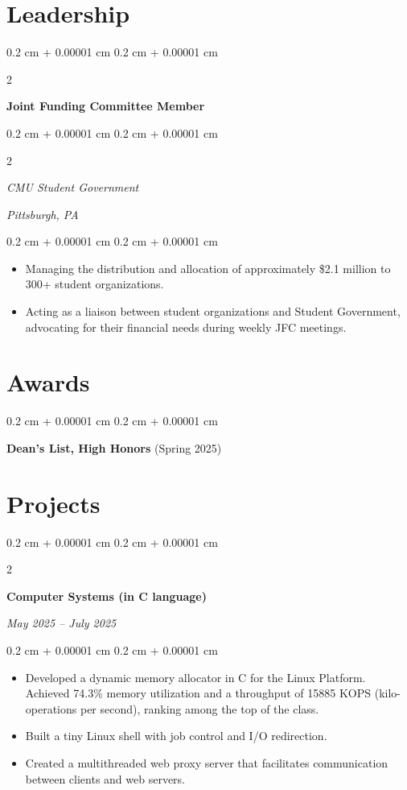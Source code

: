 \documentclass[10pt, letterpaper]{article}
\newenvironment{highlights}{
    \begin{itemize}[
        topsep=0.10 cm,
        parsep=0.10 cm,
        partopsep=0pt,
        itemsep=0pt,
        leftmargin=0.4 cm + 10pt
    ]
}{
    \end{itemize}
} %
\newenvironment{onecolentry}{
    \begin{adjustwidth}{
        0.2 cm + 0.00001 cm
    }{
        0.2 cm + 0.00001 cm
    }
}{
    \end{adjustwidth}
} %
\newenvironment{twocolentry}[2][]{
    \onecolentry
    \def\secondColumn{#2}
    \setcolumnwidth{\fill, 4.5 cm}
    \begin{paracol}{2}
}{
    \switchcolumn \raggedleft \secondColumn
    \end{paracol}
    \endonecolentry
} %
\begin{document}
    \section{Leadership}
        \begin{twocolentry}{
            }
            \textbf{Joint Funding Committee Member}
        \end{twocolentry}
        \begin{twocolentry}{
            \textit{Pittsburgh, PA}}
            \textit{CMU Student Government}
        \end{twocolentry}

        \vspace{0.10 cm}
        \begin{onecolentry}
            \begin{highlights}
                \item Managing the distribution and allocation of approximately \$2.1 million to 300+ student organizations.
                \item Acting as a liaison between student organizations and Student Government, advocating for their financial needs during weekly JFC meetings.
            \end{highlights}
        \end{onecolentry}
    \section{Awards}
        \begin{onecolentry}
            \textbf{Dean's List, High Honors} (Spring 2025)
        \end{onecolentry}
    \section{Projects}
        \begin{twocolentry}{
        \textit{May 2025 – July 2025}}
            \textbf{Computer Systems (in C language)}
        \end{twocolentry}

        \vspace{0.10 cm}
        \begin{onecolentry}
            \begin{highlights}
                \item Developed a dynamic memory allocator in C for the Linux Platform. Achieved 74.3\% memory utilization and a throughput of 15885 KOPS (kilo-operations per second), ranking among the top of the class.
                \item Built a tiny Linux shell with job control and I/O redirection.
                \item Created a multithreaded web proxy server that facilitates communication between clients and web servers.
            \end{highlights}
        \end{onecolentry}
\end{document}

